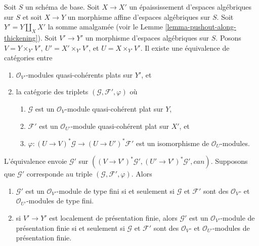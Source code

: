 \begin{lemma}
\label{lemma-space-over-pushout-flat-modules}
Soit $S$ un schéma de base.
Soit $X \to X'$ un épaississement d'espaces algébriques sur $S$
et soit $X \to Y$ un morphisme affine d'espaces algébriques sur $S$.
Soit $Y' = Y \amalg_X X'$ la somme amalgamée
(voir le Lemme \ref{lemma-pushout-along-thickening}).
Soit $V' \to Y'$ un morphisme d'espaces algébriques sur $S$. Posons
$V = Y \times_{Y'} V'$, $U' = X' \times_{Y'} V'$, et $U = X \times_{Y'} V'$.
Il existe une équivalence de catégories entre
\begin{enumerate}
\item $\mathcal{O}_{V'}$-modules quasi-cohérents plats sur $Y'$, et
\item la catégorie des triplets $(\mathcal{G}, \mathcal{F}', \varphi)$ où
\begin{enumerate}
\item $\mathcal{G}$ est un $\mathcal{O}_V$-module quasi-cohérent plat sur $Y$,
\item $\mathcal{F}'$ est un $\mathcal{O}_{U'}$-module quasi-cohérent plat
sur $X'$, et
\item $\varphi : (U \to V)^*\mathcal{G} \to (U \to U')^*\mathcal{F}'$ est un isomorphisme de $\mathcal{O}_U$-modules.
\end{enumerate}
\end{enumerate}
L'équivalence envoie $\mathcal{G}'$ sur
$((V \to V')^*\mathcal{G}', (U' \to V')^*\mathcal{G}', can)$.
Supposons que $\mathcal{G}'$ corresponde au triple
$(\mathcal{G}, \mathcal{F}', \varphi)$. Alors
\begin{enumerate}
\item[(a)] $\mathcal{G}'$ est un $\mathcal{O}_{V'}$-module de type fini si et seulement si $\mathcal{G}$ et $\mathcal{F}'$ sont des $\mathcal{O}_V$- et $\mathcal{O}_{U'}$-modules de type fini.
\item[(b)] si $V' \to Y'$ est localement de présentation finie, alors $\mathcal{G}'$ est un $\mathcal{O}_{V'}$-module de présentation finie si et seulement si $\mathcal{G}$ et $\mathcal{F}'$ sont des $\mathcal{O}_V$- et $\mathcal{O}_{U'}$-modules de présentation finie.
\end{enumerate}
\end{lemma}

